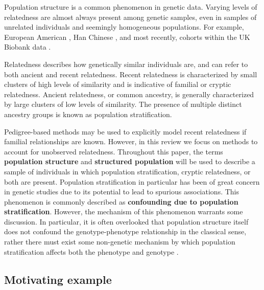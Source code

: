 Population structure is a common phenomenon in genetic data. Varying levels of relatedness are almost always present among genetic samples, even in samples of unrelated individuals and seemingly homogeneous populations. For example, European American \cite{campbell2005demonstrating}, Han Chinese \cite{xu2009genomic, chen2009genetic}, and most recently, cohorts within the UK Biobank data \cite{haworth2019apparent}.

Relatedness describes how genetically similar individuals are, and can refer to both ancient and recent relatedness.  Recent relatedness is characterized by small clusters of high levels of similarity and is indicative of familial or cryptic relatedness. Ancient relatedness, or common ancestry, is generally characterized by large clusters of low levels of similarity. The presence of multiple distinct ancestry groups is known as population stratification. 

Pedigree-based methods may be used to explicitly model recent relatedness if familial relationships are known. However, in this review we focus on methods to account for unobserved relatedness. Throughout this paper, the terms \textbf{population structure} and \textbf{structured population} will be used to describe a sample of individuals in which population stratification, cryptic relatedness, or both are present. Population stratification in particular has been of great concern in genetic studies due to its potential to lead to spurious associations. This phenomenon is commonly described as \textbf{confounding due to population stratification}. However, the mechanism of this phenomenon warrants some discussion. In particular, it is often overlooked that population structure itself does not confound the genotype-phenotype relationship in the classical sense, rather there must exist some non-genetic mechanism by which population stratification affects both the phenotype and genotype \cite{barton2019population, vilhjalmsson2012nature}. \\



\subsection{Motivating example}

